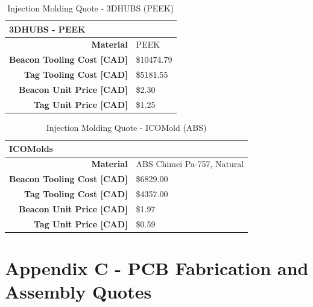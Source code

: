 \bgroup
\def\arraystretch{1.75}
\begin{table}[H]
\centering
\begin{tabular}{ | m{5cm} | m{10cm} |}
\hline
\multicolumn{2}{|l|}{\textbf{3DHUBS - PEEK}}  \\ 
\hline
\multicolumn{1}{|r|}{\textbf{Material}} & PEEK \\
\hline
\multicolumn{1}{|r|}{\textbf{Beacon Tooling Cost [CAD]}} & \$10474.79 \\
\hline
\multicolumn{1}{|r|}{\textbf{Tag Tooling Cost [CAD]}} & \$5181.55 \\
\hline
\multicolumn{1}{|r|}{\textbf{Beacon Unit Price [CAD]}} & \$2.30 \\
\hline
\multicolumn{1}{|r|}{\textbf{Tag Unit Price [CAD]}} & \$1.25 \\
\hline
\end{tabular}
\caption{Injection Molding Quote - 3DHUBS (PEEK)}
\end{table}

\bgroup
\def\arraystretch{1.75}
\begin{table}[H]
\centering
\begin{tabular}{ | m{5cm} | m{10cm} |}
\hline
\multicolumn{2}{|l|}{\textbf{ICOMolds}}  \\ 
\hline
\multicolumn{1}{|r|}{\textbf{Material}} & ABS Chimei Pa-757, Natural \\
\hline
\multicolumn{1}{|r|}{\textbf{Beacon Tooling Cost [CAD]}} & \$6829.00 \\
\hline
\multicolumn{1}{|r|}{\textbf{Tag Tooling Cost [CAD]}} & \$4357.00 \\
\hline
\multicolumn{1}{|r|}{\textbf{Beacon Unit Price [CAD]}} & \$1.97 \\
\hline
\multicolumn{1}{|r|}{\textbf{Tag Unit Price [CAD]}} & \$0.59 \\
\hline
\end{tabular}
\caption{Injection Molding Quote - ICOMold (ABS)}
\end{table}


\pagebreak
\setcounter{section}{6}
\section{Appendix C - PCB Fabrication and Assembly Quotes}

